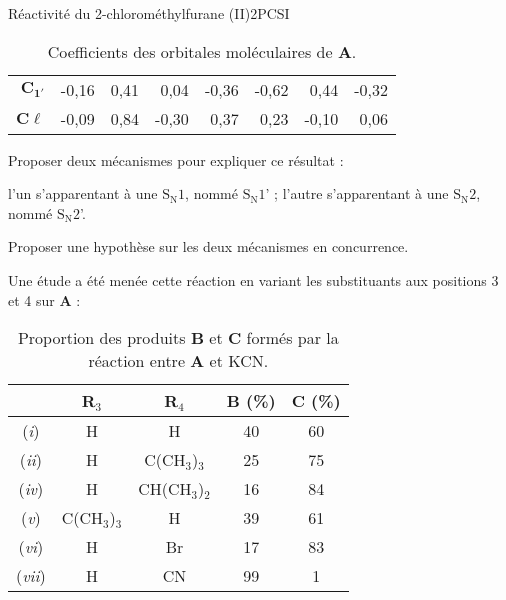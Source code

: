 \begin{exercise}{Réactivité du 2-chlorométhylfurane (II)}{2}{PCSI}
\begin{questions}
\begin{EnvUplevel}
\begin{table}[H]
\begin{tabular}{rddddddd}
 & -0,16                          & 0,41                           & 0,04                           & -0,36                          & -0,62                          & 0,44                           & -0,32                          \\
    & -0,09                          & 0,84                           & -0,30                          & 0,37                           & 0,23                           & -0,10                          & 0,06                           \\ \hline
\end{tabular}
\caption{Coefficients des orbitales moléculaires de \textbf{A}.}
\end{table}

\vspace{-1em}

Proposer deux mécanismes pour expliquer ce résultat :
\end{EnvUplevel}  
    \question l'un s'apparentant à une $\mathrm{S_N1}$, nommé $\mathrm{S_N1}$' ;
    \question l'autre s'apparentant à une $\mathrm{S_N2}$, nommé $\mathrm{S_N2}$'.
    
    \question Proposer une hypothèse sur les deux mécanismes en concurrence.
    
\begin{EnvUplevel}
    Une étude a été menée cette réaction en variant les substituants aux positions 3 et 4 sur \textbf{A} :
    \begin{table}[H]
    \centering
    \begin{tabular}{ccccc}
        & R$_3$ & R$_4$ & \textbf{B} (\%) & \textbf{C} (\%) \\ \hline\hline
       (\textit{i}) & H     &  H    & 40              & 60              \\
       (\textit{ii}) & H     &  C(CH$_3$)$_3$     & 25              & 75              \\           
       (\textit{iv}) & H     &  CH(CH$_3$)$_2$     & 16              & 84              \\    
       (\textit{v}) & C(CH$_3$)$_3$ & H       & 39              & 61              \\    
       (\textit{vi}) & H     &  Br     & 17              & 83             \\    
       (\textit{vii}) & H     &  CN     & 99              & 1           \\    \hline
    \end{tabular}
    \caption{Proportion des produits \textbf{B} et \textbf{C} formés par la réaction entre \textbf{A} et KCN.}
    \end{table}
    

\end{EnvUplevel}
\end{questions}
\end{exercise}
